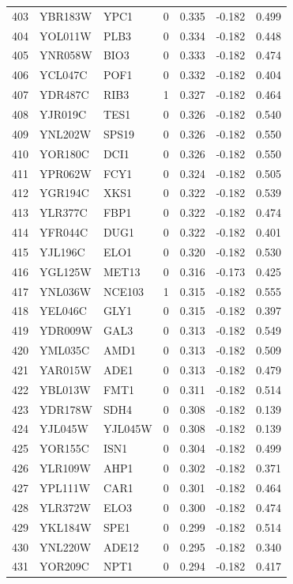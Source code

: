 \begin{longtable}{rllrrrr}
403 & YBR183W & YPC1 & 0 & 0.335 & -0.182 & 0.499\\
404 & YOL011W & PLB3 & 0 & 0.334 & -0.182 & 0.448\\
405 & YNR058W & BIO3 & 0 & 0.333 & -0.182 & 0.474\\
406 & YCL047C & POF1 & 0 & 0.332 & -0.182 & 0.404\\
407 & YDR487C & RIB3 & 1 & 0.327 & -0.182 & 0.464\\
408 & YJR019C & TES1 & 0 & 0.326 & -0.182 & 0.540\\
409 & YNL202W & SPS19 & 0 & 0.326 & -0.182 & 0.550\\
410 & YOR180C & DCI1 & 0 & 0.326 & -0.182 & 0.550\\
411 & YPR062W & FCY1 & 0 & 0.324 & -0.182 & 0.505\\
412 & YGR194C & XKS1 & 0 & 0.322 & -0.182 & 0.539\\
413 & YLR377C & FBP1 & 0 & 0.322 & -0.182 & 0.474\\
414 & YFR044C & DUG1 & 0 & 0.322 & -0.182 & 0.401\\
415 & YJL196C & ELO1 & 0 & 0.320 & -0.182 & 0.530\\
416 & YGL125W & MET13 & 0 & 0.316 & -0.173 & 0.425\\
417 & YNL036W & NCE103 & 1 & 0.315 & -0.182 & 0.555\\
418 & YEL046C & GLY1 & 0 & 0.315 & -0.182 & 0.397\\
419 & YDR009W & GAL3 & 0 & 0.313 & -0.182 & 0.549\\
420 & YML035C & AMD1 & 0 & 0.313 & -0.182 & 0.509\\
421 & YAR015W & ADE1 & 0 & 0.313 & -0.182 & 0.479\\
422 & YBL013W & FMT1 & 0 & 0.311 & -0.182 & 0.514\\
423 & YDR178W & SDH4 & 0 & 0.308 & -0.182 & 0.139\\
424 & YJL045W & YJL045W & 0 & 0.308 & -0.182 & 0.139\\
425 & YOR155C & ISN1 & 0 & 0.304 & -0.182 & 0.499\\
426 & YLR109W & AHP1 & 0 & 0.302 & -0.182 & 0.371\\
427 & YPL111W & CAR1 & 0 & 0.301 & -0.182 & 0.464\\
428 & YLR372W & ELO3 & 0 & 0.300 & -0.182 & 0.474\\
429 & YKL184W & SPE1 & 0 & 0.299 & -0.182 & 0.514\\
430 & YNL220W & ADE12 & 0 & 0.295 & -0.182 & 0.340\\
431 & YOR209C & NPT1 & 0 & 0.294 & -0.182 & 0.417\\

\end{longtable}
